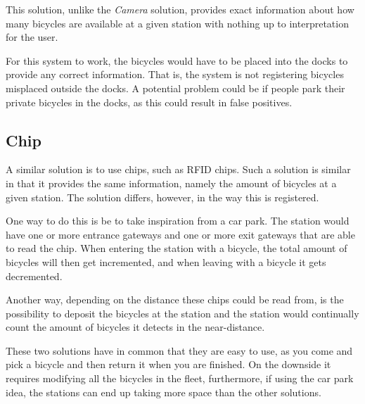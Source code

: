 This solution, unlike the \textit{Camera} solution, provides exact information about how many bicycles are available at a given station with nothing up to interpretation for the user.

For this system to work, the bicycles would have to be placed into the docks to provide any correct information.
That is, the system is not registering bicycles misplaced outside the docks.
A potential problem could be if people park their private bicycles in the docks, as this could result in false positives.

\subsection{Chip}
A similar solution is to use chips, such as RFID chips. 
Such a solution is similar in that it provides the same information, namely the amount of bicycles at a given station.
The solution differs, however, in the way this is registered.

One way to do this is be to take inspiration from a car park.
The station would have one or more entrance gateways and one or more exit gateways that are able to read the chip.
When entering the station with a bicycle, the total amount of bicycles will then get incremented, and when leaving with a bicycle it gets decremented.

Another way, depending on the distance these chips could be read from, is the possibility to deposit the bicycles at the station and the station would continually count the amount of bicycles it detects in the near-distance.

These two solutions have in common that they are easy to use, as you come and pick a bicycle and then return it when you are finished.
On the downside it requires modifying all the bicycles in the fleet, furthermore, if using the car park idea, the stations can end up taking more space than the other solutions. 

